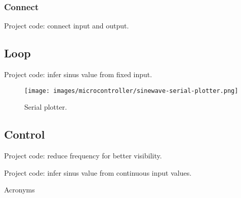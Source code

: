 \documentclass[aspectratio=169]{beamer}
\begin{document}
\subsubsection{Connect}

\begin{frame}
    \begin{listing}[H]
        \caption{Project code: connect input and output.}
        \label{lst:arduino:tflite:sinewave:setup:connect}
    \end{listing}
\end{frame}

\subsection{Loop}

\begin{frame}
    \begin{listing}[H]
        \caption{Project code: infer sinus value from fixed input.}
        \label{lst:arduino:tflite:sinewave:loop}
    \end{listing}
\end{frame}

\begin{frame}
    \begin{figure}
        \texttt{[image: images/microcontroller/sinewave-serial-plotter.png]}
        \caption{Serial plotter.}
    \end{figure}
\end{frame}

\subsection{Control }

\begin{frame}
    \begin{listing}[H]
        \caption{Project code: reduce frequency for better visibility.}
        \label{lst:arduino:tflite:sinewave:control:settings}
    \end{listing}
\end{frame}

\begin{frame}
    \begin{listing}[H]
        \caption{Project code: infer sinus value from continuous input values.}
        \label{lst:arduino:tflite:sinewave:control:loop}
    \end{listing}
\end{frame}

\appendix

\begin{frame}[allowframebreaks]{Acronyms}
    \printglossary[type=\acronymtype, nonumberlist]
\end{frame}

%     
\end{document}
